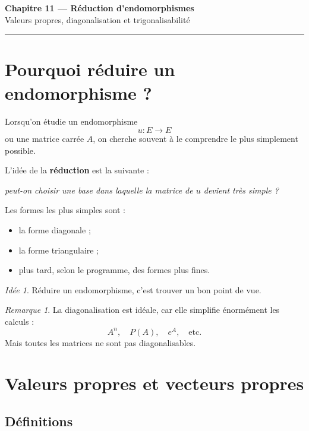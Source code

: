 \documentclass[11pt,a4paper]{article}
\theoremstyle{remark}
\newtheorem{remarque}[definition]{Remarque}
\newtheorem*{idee}{Idée}
\begin{document}
\begin{center}
    {\LARGE \textbf{Chapitre 11 --- Réduction d’endomorphismes}}\\[0.4em]
    {\large Valeurs propres, diagonalisation et trigonalisabilité}
\end{center}

\hrule
\vspace{1em}

\tableofcontents

\newpage

\section{Pourquoi réduire un endomorphisme ?}

Lorsqu’on étudie un endomorphisme
\[
u:E\to E
\]
ou une matrice carrée \(A\), on cherche souvent à le comprendre le plus simplement possible.

L’idée de la \textbf{réduction} est la suivante :
\begin{center}
\textit{peut-on choisir une base dans laquelle la matrice de \(u\) devient très simple ?}
\end{center}

Les formes les plus simples sont :
\begin{itemize}
    \item la forme diagonale ;
    \item la forme triangulaire ;
    \item plus tard, selon le programme, des formes plus fines.
\end{itemize}

\begin{idee}
Réduire un endomorphisme, c’est trouver un bon point de vue.
\end{idee}

\begin{remarque}
La diagonalisation est idéale, car elle simplifie énormément les calculs :
\[
A^n,\quad P(A),\quad e^A,\quad \text{etc.}
\]
Mais toutes les matrices ne sont pas diagonalisables.
\end{remarque}

\section{Valeurs propres et vecteurs propres}

\subsection{Définitions}
\end{document}
